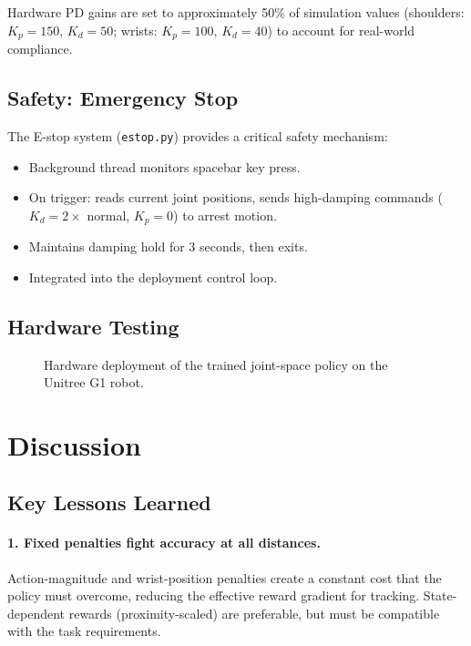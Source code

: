 \documentclass[11pt,a4paper]{article}
\begin{document}
\noindent Hardware PD gains are set to approximately 50\% of simulation values (shoulders: $K_p=150$, $K_d=50$; wrists: $K_p=100$, $K_d=40$) to account for real-world compliance.

\subsection{Safety: Emergency Stop}
The E-stop system (\texttt{estop.py}) provides a critical safety mechanism:
\begin{itemize}[nosep]
  \item Background thread monitors spacebar key press.
  \item On trigger: reads current joint positions, sends high-damping commands ($K_d = 2\times$ normal, $K_p = 0$) to arrest motion.
  \item Maintains damping hold for 3 seconds, then exits.
  \item Integrated into the deployment control loop.
\end{itemize}

\subsection{Hardware Testing}

\begin{figure}[H]
\centering
\caption{Hardware deployment of the trained joint-space policy on the Unitree G1 robot.}
\label{fig:hardware}
\end{figure}

\section{Discussion}
\label{sec:discussion}

\subsection{Key Lessons Learned}

\paragraph{1. Fixed penalties fight accuracy at all distances.}
Action-magnitude and wrist-position penalties create a constant cost that the policy must overcome, reducing the effective reward gradient for tracking. State-dependent rewards (proximity-scaled) are preferable, but must be compatible with the task requirements.
\end{document}
